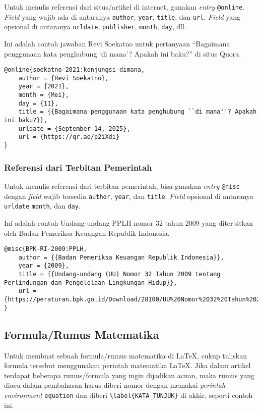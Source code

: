 Untuk menulis referensi dari situs/artikel di internet, gunakan \textit{entry} \texttt{@online}. \textit{Field} yang wajib ada di antaranya \texttt{author}, \texttt{year}, \texttt{title}, dan \texttt{url}. \textit{Field} yang opsional di antaranya \texttt{urldate}, \texttt{publisher}, \texttt{month}, \texttt{day}, dll.

Ini adalah contoh jawaban Revi Soekatno untuk pertanyaan ``Bagaimana penggunaan kata penghubung `di mana'? Apakah ini baku?'' di situs Quora.

\begin{lstlisting}
@online{soekatno-2021:konjungsi-dimana,
    author = {Revi Soekatno},
    year = {2021},
    month = {Mei},
    day = {11},
    title = {{Bagaimana penggunaan kata penghubung ``di mana''? Apakah ini baku?}},
    urldate = {September 14, 2025},
    url = {https://qr.ae/p2iXdi}
}
\end{lstlisting}

\subsubsection{Referensi dari Terbitan Pemerintah}

Untuk menulis referensi dari terbitan pemerintah, bisa gunakan \textit{entry} \texttt{@nisc} dengan \textit{field} wajib tersedia \texttt{author}, \texttt{year}, dan \texttt{title}. \textit{Field} opsional di antaranya \texttt{urldate} \texttt{month}, dan \texttt{day}.

Ini adalah contoh Undang-undang PPLH nomor 32 tahun 2009 yang diterbitkan oleh Badan Pemeriksa Keuangan Republik Indonesia.

\begin{lstlisting}
@misc{BPK-RI-2009:PPLH,
    author = {{Badan Pemeriksa Keuangan Republik Indonesia}},
    year = {2009},
    title = {{Undang-undang (UU) Nomor 32 Tahun 2009 tentang Perlindungan dan Pengelolaan Lingkungan Hidup}},
    url = {https://peraturan.bpk.go.id/Download/28100/UU%20Nomor%2032%20Tahun%202009.pdf}
}
\end{lstlisting}

\subsection{Formula/Rumus Matematika}

Untuk membuat sebuah formula/rumus matematika di LaTeX, cukup tuliskan formula tersebut menggunakan perintah matematika LaTeX. Jika dalam artikel terdapat beberapa rumus/formula yang ingin dijadikan acuan, maka rumus yang diacu dalam pembahasan harus diberi nomor dengan memakai \textit{perintah environment} \verb|equation| dan diberi \verb|\label{KATA_TUNJUK}| di akhir, seperti contoh ini.

